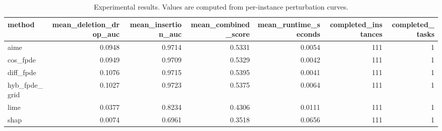 \begin{table}[t]
\caption{Experimental results. Values are computed from per-instance perturbation curves.}
\label{tab:main_results_computed}
\centering
\begin{tabular}{lrrrrrr}
\toprule
method & mean\_deletion\_drop\_auc & mean\_insertion\_auc & mean\_combined\_score & mean\_runtime\_seconds & completed\_instances & completed\_tasks \\
\midrule
aime & 0.0948 & 0.9714 & 0.5331 & 0.0054 & 111 & 1 \\
cos\_fpde & 0.0949 & 0.9709 & 0.5329 & 0.0042 & 111 & 1 \\
diff\_fpde & 0.1076 & 0.9715 & 0.5395 & 0.0041 & 111 & 1 \\
hyb\_fpde\_grid & 0.1027 & 0.9723 & 0.5375 & 0.0064 & 111 & 1 \\
lime & 0.0377 & 0.8234 & 0.4306 & 0.0111 & 111 & 1 \\
shap & 0.0074 & 0.6961 & 0.3518 & 0.0656 & 111 & 1 \\
\bottomrule
\end{tabular}

\end{table}
